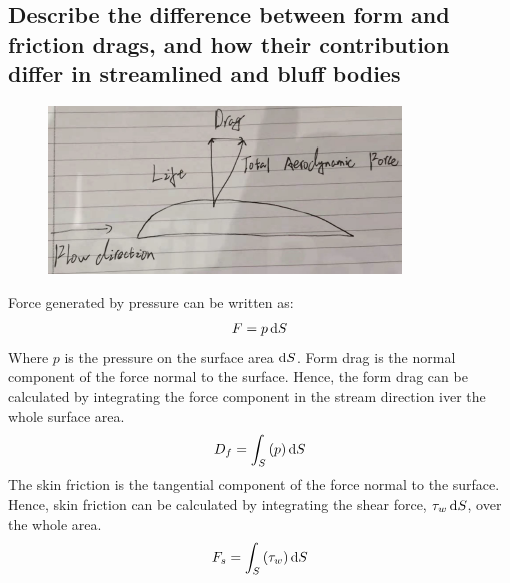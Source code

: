 \documentclass[11pt]{article}
\numberwithin{equation}{section}
\begin{document}
\subsection*{Describe the difference between form and friction drags, and how their contribution differ in streamlined and bluff bodies}
\begin{figure}[H]
  \centering
  \includegraphics[width = 0.5 \textwidth]{./img/diagram1.png}
  \caption{}
\end{figure}
Force generated by pressure can be written as:
\begin{align}
  F = p \dif S
\end{align}
Where $p$ is the pressure on the surface area $\dif S$. Form drag is the normal component of the force normal to the surface. Hence, the form drag can be calculated by integrating the force component in the stream direction iver the whole surface area.
\begin{align}
  D_f = \int_S \left(p\right)\dif S
\end{align}
The skin friction is the tangential component of the force normal to the surface. Hence, skin friction can be calculated by integrating the shear force, $\tau_w \dif S$, over the whole area.
\begin{align}
  F_s = \int_S \left(\tau_w\right)\dif S
\end{align}
\end{document}
